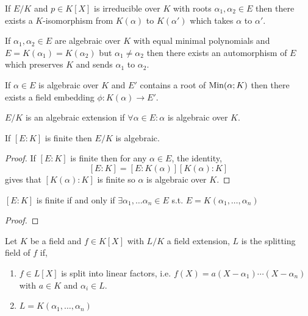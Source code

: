 \documentclass[12pt]{extarticle}
\begin{document}
\begin{corollary}
If $E/K$ and $p \in K[X]$ is irreducible over $K$ with roots $\alpha_1, \alpha_2 \in E$ then there exists a $K$-isomorphism from $K(\alpha)$ to $K(\alpha')$ which takes $\alpha$ to $\alpha'$.  
\end{corollary}

\begin{corollary}
If $\alpha_1, \alpha_2 \in E$ are algebraic over $K$ with equal minimal polynomials and $E = K(\alpha_1) = K(\alpha_2)$ but $\alpha_1 \neq \alpha_2$ then there exists an automorphism of $E$ which preserves $K$ and sends $\alpha_1$ to $\alpha_2$.  
\end{corollary}

\begin{corollary}
If $\alpha \in E$ is algebraic over $K$ and $E'$ contains a root of $\mathrm{Min}(\alpha;K)$ then there exists a field embedding $\phi : K(\alpha) \to E'$. 
\end{corollary}

\begin{definition}
$E/K$ is an algebraic extension if $\forall \alpha \in E : \alpha$ is algebraic over $K$.
\end{definition} 

\begin{proposition}
If $[E : K]$ is finite then $E/K$ is algebraic.
\end{proposition}

\begin{proof}
If $[E : K]$ is finite then for any $\alpha \in E$, the identity, 
\[[E : K] = [E : K(\alpha)][K(\alpha) : K]\] gives that $[K(\alpha) : K]$ is finite so $\alpha$ is algebraic over $K$.
\end{proof}

\begin{proposition}
$[E : K]$ is finite if and only if $\exists \alpha_1, \dots \alpha_n \in E$ s.t. $E = K(\alpha_1, \dots, \alpha_n)$ 
\end{proposition}

\begin{proof}

\end{proof}
 
\begin{definition}
Let $K$ be a field and $f \in K[X]$ with $L/K$ a field extension, $L$ is the splitting field of $f$ if,
\begin{enumerate}
\item $f \in L[X]$ is split into linear factors, i.e. $f(X) = a (X - \alpha_1) \cdots (X - \alpha_n)$ with $a \in K$ and $\alpha_i \in L$.
\item $L = K(\alpha_1, \dots, \alpha_n)$
\end{enumerate}
\end{definition}
\end{document}
